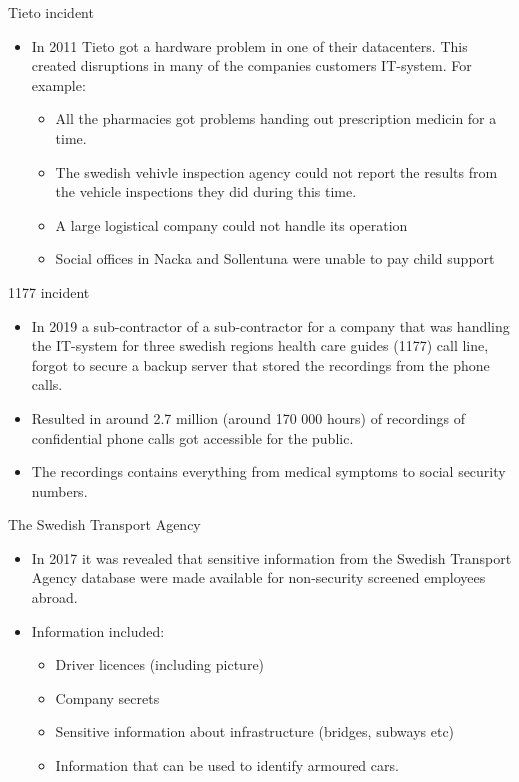 \documentclass{beamer}
\begin{document}
\begin{frame}{Tieto incident}
  \begin{itemize}
    \item In 2011 Tieto got a hardware problem in one of their datacenters. This
      created disruptions in many of the companies customers IT-system. For
      example: 
      \begin{itemize}
        \item All the pharmacies got problems handing out prescription medicin for a
          time.
        \item The swedish vehivle inspection agency could not report the results
          from the vehicle inspections they did during this time.
        \item A large logistical company could not handle its operation
        \item Social offices in Nacka and Sollentuna were unable to pay child
          support
      \end{itemize}
  \end{itemize}
\end{frame}
\begin{frame}{1177 incident}
  \begin{itemize}
    \item In 2019 a sub-contractor of a sub-contractor for a company that was
      handling the IT-system for three swedish regions health care guides (1177)
      call line, forgot to secure a backup server that stored the recordings
      from the phone calls.
    \item Resulted in around 2.7 million (around 170 000 hours) of recordings of
      confidential phone calls got accessible for the public.
    \item The recordings contains everything from medical symptoms to social
      security numbers.
  \end{itemize}
\end{frame}
\begin{frame}{The Swedish Transport Agency}
  \begin{itemize}
    \item In 2017 it was revealed that sensitive information from the Swedish
      Transport Agency database were made available for non-security screened
      employees abroad. 
    \item Information included:
      \begin{itemize}
        \item Driver licences (including picture)
        \item Company secrets
        \item Sensitive information about infrastructure (bridges, subways etc)
        \item Information that can be used to identify armoured cars.
      \end{itemize}
  \end{itemize}
\end{frame}
\end{document}
